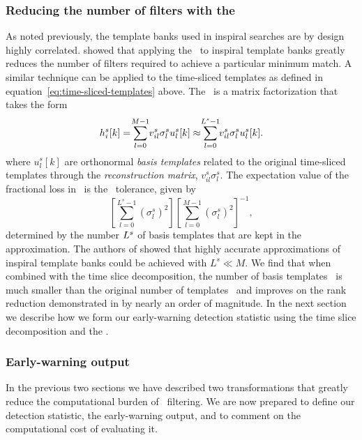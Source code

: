 \subsubsection{Reducing the number of filters with the \SVD{}}
\label{sec:svd}

As noted previously, the template banks used in inspiral searches are by design
highly correlated.  \citet{Cannon:2010p10398} showed that applying the \SVD\
to inspiral template banks greatly reduces the number of filters required to achieve a
particular minimum match.  A similar technique can be applied to the time-sliced
templates as defined in equation~\ref{eq:time-sliced-templates} above.  The \SVD\
is a matrix factorization that takes the form
%
\begin{equation}
h_i^s[k] = \sum_{\mathclap{l=0}}^{\mathclap{M-1}} v_{il}^s \sigma_l^s u_l^s[k] \approx \sum_{\mathclap{l=0}}^{\mathclap{L^s-1}} v_{il}^s \sigma_l^s u_l^s[k].
\label{eq:svddecomp}
\end{equation}
where $u_l^s[k]$ are orthonormal \emph{basis templates} related to the original
time-sliced templates through the \emph{reconstruction matrix}, $v_{il}^s\sigma_l^s$.
The expectation value of the fractional loss in \SNR\ is the \SVD\ tolerance, given by
%
\begin{equation*}
\left[ \sum_{l=0}^{L^s-1} \left( \sigma_l^s \right)^2 \right]\left[ \sum_{l=0}^{M-1} \left( \sigma_l^s \right)^2 \right]^{-1},
\end{equation*}
%
determined by the number $L^s$ of basis templates that are kept in
the approximation.  The authors of \citet{Cannon:2010p10398}
showed that highly accurate approximations of inspiral template banks could be
achieved with $L^s \ll M$.  We find that when combined with the
time slice decomposition, the number of basis templates \numsvdtmps\ is much
smaller than the original number of templates \numtmps\ and improves on the
rank reduction demonstrated in \citep{Cannon:2010p10398} by nearly an order
of magnitude.  In the next section we describe how we form our early-warning
detection statistic using the time slice decomposition and the \SVD.

\subsubsection{Early-warning output}

In the previous two sections we have described two transformations that greatly
reduce the computational burden of \TD\ filtering.  We are now prepared to define
our detection statistic, the early-warning output, and to comment on the computational
cost of evaluating it.

